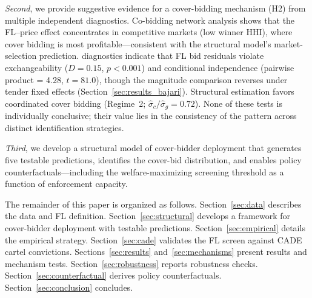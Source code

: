 \emph{Second}, we provide suggestive evidence for a cover-bidding
mechanism (H2) from multiple independent diagnostics. Co-bidding network
analysis shows that the FL--price effect concentrates in competitive
markets (low winner HHI), where cover bidding is most profitable---consistent
with the structural model's market-selection prediction.
\cites{bajari2003deciding} diagnostics indicate that FL bid residuals
violate exchangeability ($D = 0.15$, $p < 0.001$) and conditional
independence (pairwise product = 4.28, $t = 81.0$), though the
magnitude comparison reverses under tender fixed effects
(Section~\ref{sec:results_bajari}). Structural estimation favors
coordinated cover bidding (Regime~2;
$\hat{\sigma}_c / \hat{\sigma}_g = 0.72$). None of these tests is
individually conclusive; their value lies in the consistency of the
pattern across distinct identification strategies.

\emph{Third}, we develop a structural model of cover-bidder deployment
that generates five testable predictions, identifies the cover-bid
distribution, and enables policy counterfactuals---including the
welfare-maximizing screening threshold as a function of enforcement
capacity.

The remainder of this paper is organized as follows.
Section~\ref{sec:data} describes the data and FL definition.
Section~\ref{sec:structural} develops a framework for cover-bidder
deployment with testable predictions. Section~\ref{sec:empirical}
details the empirical strategy. Section~\ref{sec:cade} validates the
FL screen against CADE cartel convictions. Sections~\ref{sec:results}
and~\ref{sec:mechanisms} present results and mechanism tests.
Section~\ref{sec:robustness} reports robustness checks.
Section~\ref{sec:counterfactual} derives policy counterfactuals.
Section~\ref{sec:conclusion} concludes.
